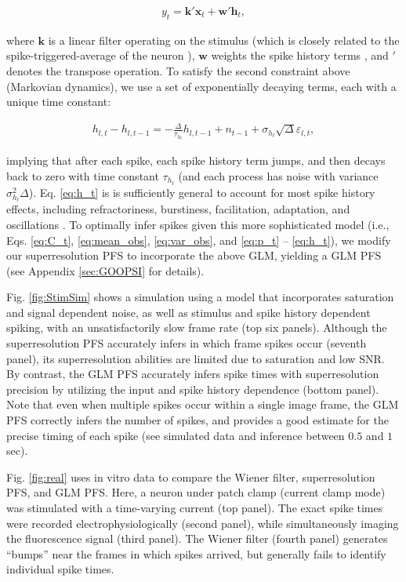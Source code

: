 \documentclass[10pt]{article}
\providecommand{\ve}[1]{\boldsymbol{#1}}
\providecommand{\ve}[1]{\boldsymbol{#1}}
\begin{document}
\begin{align} \label{eq:y_t}
y_t = \ve{k}' \ve{x}_t + \ve{w}' \ve{h}_t,
\end{align}

\noindent where $\ve{k}$ is a linear filter operating on the stimulus (which is closely related to the spike-triggered-average of the neuron \cite{Paninski04c}), $\ve{w}$ weights the spike history terms \cite{TruccoloBrown05}, and $'$ denotes the transpose operation. To satisfy the second constraint above (Markovian dynamics), we use a set of exponentially decaying terms, each with a unique time constant: 

\begin{align} \label{eq:h_t}
h_{l,t} - h_{l,t-1} = - \frac{\Delta}{\tau_{h_l}}h_{l,t-1} + n_{t-1} + \sigma_{h_l} \sqrt{\Delta} \varepsilon_{l,t},
\end{align}

\noindent implying that after each spike, each spike history term jumps, and then decays back to zero with time constant $\tau_{h_l}$ (and each process has noise with variance $\sigma_{h_l}^2 \Delta$).  Eq. \ref{eq:h_t} is is sufficiently general to account for most spike history effects, including refractoriness, burstiness, facilitation, adaptation, and oscillations \cite{Paninski04}.  To optimally infer spikes given this more sophisticated model (i.e., Eqs. \ref{eq:C_t}, \ref{eq:mean_obs}, \ref{eq:var_obs}, and \ref{eq:p_t} -- \ref{eq:h_t}), we modify our superresolution PFS to incorporate the above GLM, yielding a GLM PFS (see Appendix \ref{sec:GOOPSI} for details).

Fig. \ref{fig:StimSim} shows a simulation using a model that incorporates saturation and signal dependent noise, as well as stimulus and spike history dependent spiking, with an unsatisfactorily slow frame rate (top six panels). Although the superresolution PFS accurately infers in which frame spikes occur (seventh panel), its superresolution abilities are limited due to saturation and low SNR.  By contrast, the GLM PFS accurately infers spike times with superresolution precision by utilizing the input and spike history dependence (bottom panel). Note that even when multiple spikes occur within a single image frame, the GLM PFS correctly infers the number of spikes, and provides a good estimate for the precise timing of each spike (see simulated data and inference between $0.5$ and $1$ sec). 

Fig. \ref{fig:real} uses in vitro data to compare the Wiener filter, superresolution PFS, and GLM PFS.  Here, a neuron under patch clamp (current clamp mode) was stimulated with a time-varying current (top panel).  The exact spike times were recorded electrophysiologically (second panel), while simultaneously imaging the fluorescence signal (third panel).  The Wiener filter (fourth panel) generates ``bumps'' near the frames in which spikes arrived, but generally fails to identify individual spike times.  
\end{document}
